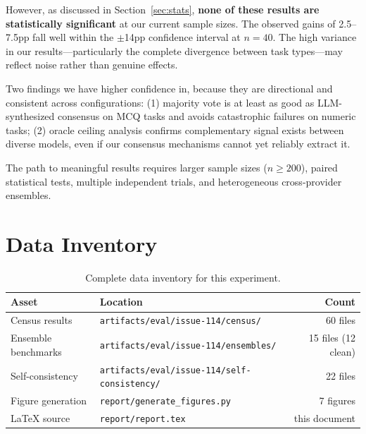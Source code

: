 \documentclass[11pt,a4paper]{article}
\begin{document}
However, as discussed in Section~\ref{sec:stats}, \textbf{none of these results are statistically significant} at our current sample sizes.
The observed gains of 2.5--7.5pp fall well within the $\pm$14pp confidence interval at $n=40$.
The high variance in our results---particularly the complete divergence between task types---may reflect noise rather than genuine effects.

Two findings we have higher confidence in, because they are directional and consistent across configurations:
(1) majority vote is at least as good as LLM-synthesized consensus on MCQ tasks and avoids catastrophic failures on numeric tasks;
(2) oracle ceiling analysis confirms complementary signal exists between diverse models, even if our consensus mechanisms cannot yet reliably extract it.

The path to meaningful results requires larger sample sizes ($n \geq 200$), paired statistical tests, multiple independent trials, and heterogeneous cross-provider ensembles.

\appendix
\section{Data Inventory}
\label{app:data}

\begin{table}[htbp]
\centering
\caption{Complete data inventory for this experiment.}
\begin{tabular}{llr}
\toprule
\textbf{Asset} & \textbf{Location} & \textbf{Count} \\
\midrule
Census results & \texttt{artifacts/eval/issue-114/census/} & 60 files \\
Ensemble benchmarks & \texttt{artifacts/eval/issue-114/ensembles/} & 15 files (12 clean) \\
Self-consistency & \texttt{artifacts/eval/issue-114/self-consistency/} & 22 files \\
Figure generation & \texttt{report/generate\_figures.py} & 7 figures \\
LaTeX source & \texttt{report/report.tex} & this document \\
\bottomrule
\end{tabular}
\end{table}
\end{document}
